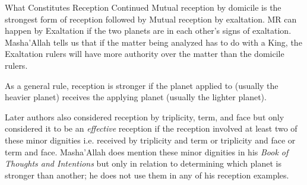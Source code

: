 \begin{frame}[t]{What Constitutes Reception Continued}
Mutual reception by domicile is the strongest form of reception followed by Mutual reception by exaltation. 
MR can happen by Exaltation if the two planets are in each other's signs of exaltation. Masha'Allah tells us that if the matter being analyzed has to do with a King, the Exaltation rulers will have more authority over the matter than the domicile rulers.

As a general rule, reception is stronger if the planet applied to (usually the heavier planet) receives the applying planet (usually the lighter planet).

Later authors also considered reception by triplicity, term, and face but only considered it to be an \textsl{effective} reception if the reception involved at least two of these minor dignities i.e. received by triplicity and term or triplicity and face or term and face. Masha'Allah does mention these minor dignities in his \textsl{Book of Thoughts and Intentions} but only in relation to determining which planet is stronger than another; he does not use them in any of his reception examples.

\end{frame}